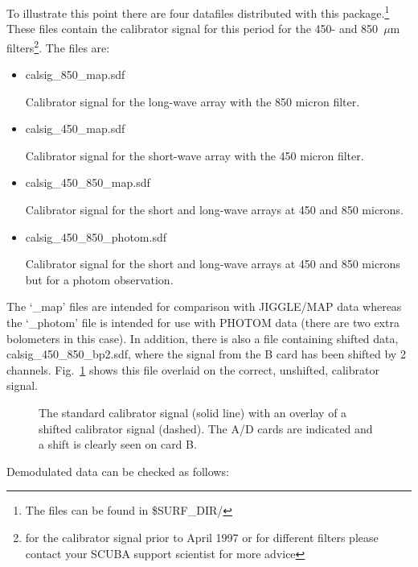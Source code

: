 \documentclass[twoside,11pt]{article}
\begin{document}
To illustrate this point there are four datafiles distributed with this
package.\footnote{The files can be found in \$SURF\_DIR/}         
These files contain the calibrator signal for this period for the
450- and 850~$\mu$m filters\footnote{for the calibrator signal prior to April
1997 or for different filters please contact your SCUBA support scientist for
more advice}. The files are:

\begin{itemize}
\item calsig\_850\_map.sdf

Calibrator signal for the long-wave array with the 850 micron filter.

\item calsig\_450\_map.sdf

Calibrator signal for the short-wave array with the 450 micron filter.

\item calsig\_450\_850\_map.sdf

Calibrator signal for the short and long-wave arrays at 450 and 850 microns.

\item calsig\_450\_850\_photom.sdf

Calibrator signal for the short and long-wave arrays at 450 and 850 microns
but for a photom observation.

\end{itemize}

The `\_map' files are intended for comparison with JIGGLE/MAP data whereas the
`\_photom' file is intended for use with PHOTOM data (there are two extra
bolometers in this case).  In addition, there is also a file containing
shifted data, calsig\_450\_850\_bp2.sdf, where the signal from the B card has
been shifted by 2 channels. Fig.\ \ref{scushift_fig} shows this file overlaid
on the correct, unshifted, calibrator signal.
 
\begin{figure}
\begin{center}
\caption{The standard calibrator signal (solid line) with an overlay of a
shifted calibrator signal (dashed). The A/D cards are indicated and a shift
is clearly seen on card B.}
\label{scushift_fig}
\end{center}
\end{figure}


Demodulated data can be checked as follows:
\end{document}
